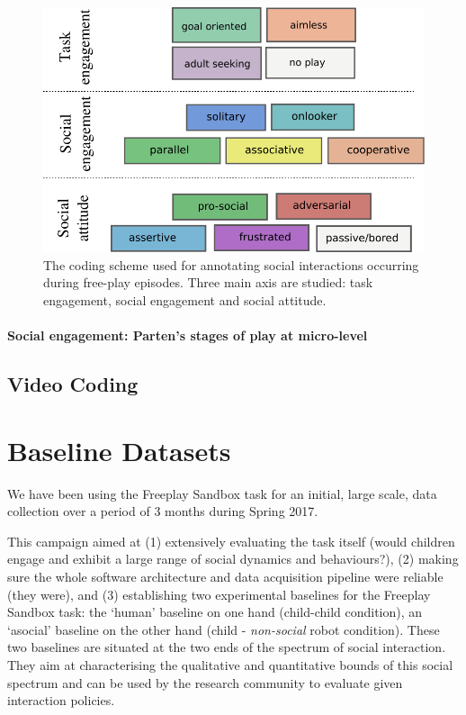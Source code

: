 \documentclass[sigconf]{acmart}
\begin{document}
\begin{figure}
    \centering
    \includegraphics[width=\columnwidth]{coding-scheme}
    \caption{The coding scheme used for annotating social interactions occurring
    during free-play episodes. Three main axis are studied: task engagement,
    social engagement and social attitude.}
    \label{fig|coding-scheme}
\end{figure}

\paragraph{Social engagement: Parten's stages of play at micro-level}

\subsection{Video Coding}



\section{Baseline Datasets}
\label{sec:dataset}

We have been using the Freeplay Sandbox task for an initial, large scale, data
collection over a period of 3 months during Spring 2017.

This campaign aimed at (1) extensively evaluating the task itself (would
children engage and exhibit a large range of social dynamics and behaviours?),
(2) making sure the whole software architecture and data acquisition pipeline
were reliable (they were), and (3) establishing two experimental baselines for
the Freeplay Sandbox task: the `human' baseline on one hand (child-child
condition), an `asocial' baseline on the other hand (child - \emph{non-social}
robot condition). These two baselines are situated at the two ends of the
spectrum of social interaction. They aim at characterising the qualitative and
quantitative bounds of this social spectrum and can be used by the research
community to evaluate given interaction policies.
\end{document}

